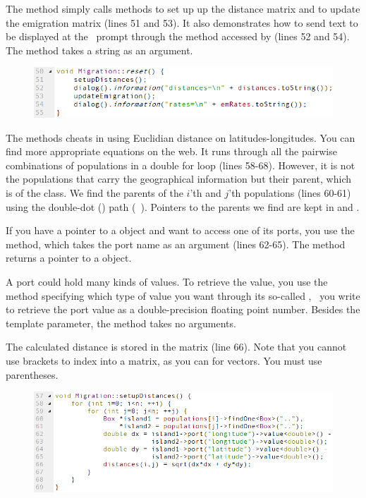 The  method simply calls methods to set up up the distance matrix and to update the emigration matrix (lines 51 and 53). It also demonstrates how to send text to be displayed at the \US\ prompt through the  method accessed by  (lines 52 and 54). The  method takes a string as an argument.

\begin{figure} [hb]
\includegraphics[scale=0.7,left]{graphics/migration-cpp-reset}
\end{figure}

The  methods cheats in using Euclidian distance on latitudes-longitudes. You can find more appropriate equations on the web. It runs through all the pairwise combinations of populations in a double for loop (lines 58-68). However, it is not the populations that carry the geographical information but their parent, which is of the  class. We find the parents of the $i$'th and $j$'th populations (lines 60-61) using the double-dot () path (\cf\ ). Pointers to the parents we find are kept in  and .

If you have a pointer to a  object and want to access one of its ports, you use the  method, which takes the port name as an argument (lines 62-65). The  method returns a pointer to a  object. 

A port could hold many kinds of values. To retrieve the value, you use the  method specifying which type of value you want through its so-called , \eg\ you write  to retrieve the port value as a double-precision floating point number. Besides the template parameter, the  method takes no arguments.

The calculated distance is stored in the  matrix (line 66). Note that you cannot use brackets to index into a matrix, as you can for vectors. You must use parentheses.

\begin{figure} [ht]
\includegraphics[scale=0.7,left]{graphics/migration-cpp-setup-distances}
\end{figure}

